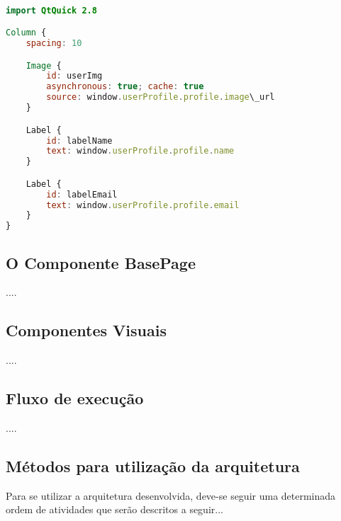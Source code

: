 \begin{center}
\begin{lstlisting}[language=qml]

import QtQuick 2.8

Column {
	spacing: 10

	Image {
		id: userImg
		asynchronous: true; cache: true
		source: window.userProfile.profile.image\_url
	}

	Label {
		id: labelName
		text: window.userProfile.profile.name
	}

	Label {
		id: labelEmail
		text: window.userProfile.profile.email
	}
}
\end{lstlisting}
\end{center}


\subsection{O Componente BasePage}\label{sec:solucao-desenvolvida}
....


\subsection{Componentes Visuais}\label{sec:solucao-desenvolvida}
....


\subsection{Fluxo de execução}\label{sec:solucao-desenvolvida}
....


\subsection{Métodos para utilização da arquitetura}
Para se utilizar a arquitetura desenvolvida, deve-se seguir uma determinada ordem de atividades que serão descritos a seguir...
